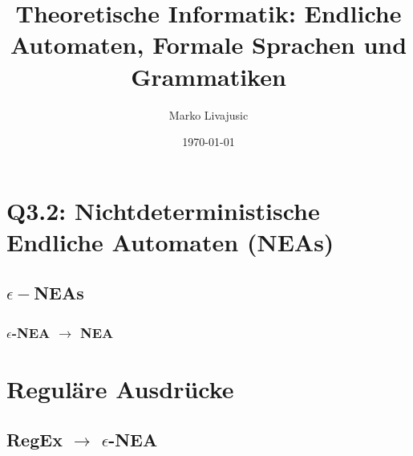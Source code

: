 \documentclass{book}
\author{Marko Livajusic}
\date{\today}
\title{Theoretische Informatik: Endliche Automaten, Formale Sprachen und Grammatiken}
\begin{document}
\maketitle
\tableofcontents
\newpage
\newpage


\section{Q3.2: Nichtdeterministische Endliche Automaten (NEAs)}
\subsection{$\epsilon-$NEAs}
\subsubsection{$\epsilon$-NEA $\to$ NEA}



\section{Reguläre Ausdrücke}
\subsection{RegEx $\rightarrow$ $\epsilon$-NEA}
\end{document}
